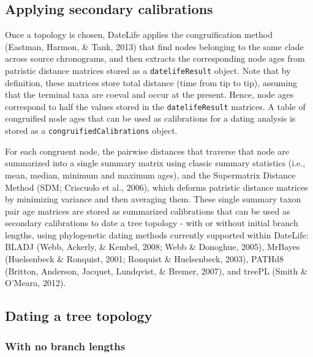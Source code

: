\documentclass[english,man]{apa6}
\begin{document}
\hypertarget{applying-secondary-calibrations}{%
\subsection{Applying secondary calibrations}\label{applying-secondary-calibrations}}

Once a topology is chosen, DateLife applies the congruification method (Eastman, Harmon, \& Tank, 2013) that find nodes belonging to the same clade across source chronograms, and then extracts the corresponding node ages from patristic distance matrices stored as a \texttt{datelifeResult} object. Note that by definition, these matrices store total distance (time from tip to tip), assuming that the terminal taxa are coeval and occur at the present. Hence, node ages correspond to half the values stored in the \texttt{datelifeResult} matrices.
A table of congruified node ages that can be used as calibrations for a dating analysis is stored as a \texttt{congruifiedCalibrations} object.

For each congruent node, the pairwise distances that traverse that node are summarized into a single summary matrix using classic summary statistics (i.e., mean, median, minimum and maximum ages), and the Supermatrix Distance Method (SDM; Criscuolo et al., 2006), which deforms patristic distance matrices by minimizing variance and then averaging them.
These single summary taxon pair age matrices are stored as summarized calibrations that can be used as secondary calibrations to date a tree topology - with or without initial branch lengths, using phylogenetic dating methods currently supported within DateLife: BLADJ (Webb, Ackerly, \& Kembel, 2008; Webb \& Donoghue, 2005), MrBayes (Huelsenbeck \& Ronquist, 2001; Ronquist \& Huelsenbeck, 2003), PATHd8 (Britton, Anderson, Jacquet, Lundqvist, \& Bremer, 2007), and treePL (Smith \& O'Meara, 2012).

\hypertarget{dating-a-tree-topology}{%
\subsection{Dating a tree topology}\label{dating-a-tree-topology}}

\hypertarget{with-no-branch-lengths}{%
\subsubsection{With no branch lengths}\label{with-no-branch-lengths}}
\end{document}
